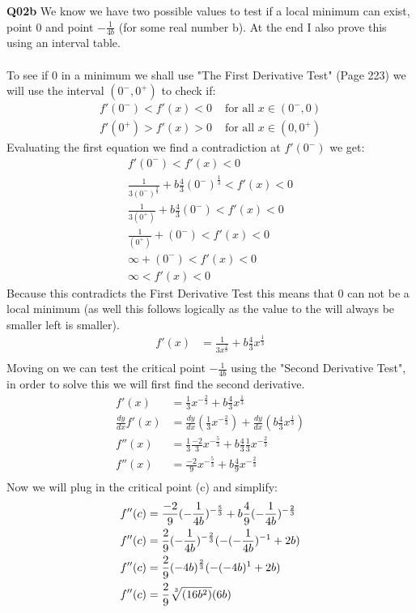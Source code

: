 \documentclass[11pt]{article}
\begin{document}
\textbf{Q02b} We know we have two possible values to test if a local minimum can exist, point 0 and point $-\frac{1}{4b}$ (for some real number b). At the end I also prove this using an interval table. \\\\
To see if 0 in a minimum we shall use "The First Derivative Test" (Page 223)  we will use the interval $(0^-,0^+)$ to check if:
\begin{align*}
f'(0^-)<f'(x) < 0 &\text{ for all $x \in (0^-,0)$} \\
f'(0^+)>f'(x) > 0 &\text{ for all $x \in (0,0^+)$}
\end{align*}
Evaluating the first equation we find a contradiction at $f'(0^-)$ we get:
\begin{align*}
f'(0^-)< f'(x) < 0 \\
\frac{1}{3(0^-)^{\frac{2}{3}}} + b\frac{4}{3}(0^-)^{\frac{1}{3}}< f'(x) < 0 \\
\frac{1}{3(0^+)} + b\frac{4}{3}(0^-)< f'(x) < 0 \\
\frac{1}{(0^+)} + (0^-)< f'(x) < 0 \\
\infty + (0^-)< f'(x) < 0 \\
\infty < f'(x) < 0 
\end{align*}
Because this contradicts the First Derivative Test this means that 0 can not be a local minimum (as well this follows logically as the value to the will always be smaller left is smaller).
\begin{align*}
f'(x) & = \frac{1}{3x^{\frac{2}{3}}} + b\frac{4}{3}x^{\frac{1}{3}}\\
\end{align*}
Moving on we can test the critical point $-\frac{1}{4b}$ using the "Second Derivative Test", in order to solve this we will first find the second derivative.
\begin{align*}
f'(x) & = \frac{1}{3}x^{-\frac{2}{3}} + b\frac{4}{3}x^{\frac{1}{3}}\\
\frac{dy}{dx}f'(x) & = \frac{dy}{dx}(\frac{1}{3}x^{-\frac{2}{3}}) + \frac{dy}{dx}(b\frac{4}{3}x^{\frac{1}{3}})\\
f''(x) & = \frac{1}{3}\frac{-2}{3}x^{-\frac{5}{3}} + b\frac{4}{3}\frac{1}{3}x^{-\frac{2}{3}}\\
f''(x) & = \frac{-2}{9}x^{-\frac{5}{3}} + b\frac{4}{9}x^{-\frac{2}{3}}\\
\end{align*}
Now we will plug in the critical point (c) and simplify:
\begin{align*}
f''(c) & = \frac{-2}{9}(-\frac{1}{4b})^{-\frac{5}{3}} + b\frac{4}{9}(-\frac{1}{4b})^{-\frac{2}{3}}\\
f''(c) & = \frac{2}{9}(-\frac{1}{4b})^{-\frac{2}{3}}(-(-\frac{1}{4b})^{-1}+2b) \\
f''(c) & = \frac{2}{9}(-4b)^{\frac{2}{3}}(-(-4b)^{1}+2b) \\
f''(c) & = \frac{2}{9}\sqrt[\leftroot{-2}\uproot{2}3]{(16b^2)}(6b) 
\end{align*}
\end{document}
